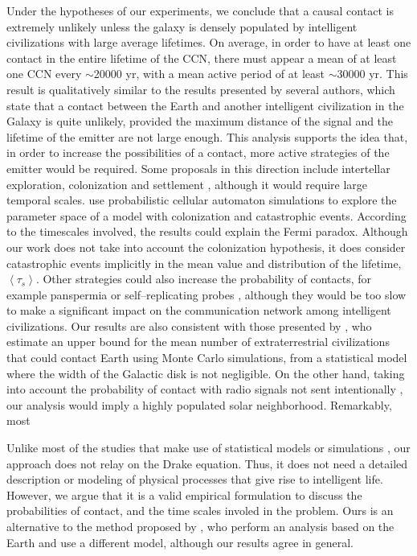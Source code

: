 \documentclass[crop]{CSLB}
\newcommand{\ceti}{CCN}
\begin{document}
Under the hypotheses of our experiments, we conclude that a causal
contact is extremely unlikely unless the galaxy is densely populated
by intelligent civilizations with large average lifetimes.
%
On average, in order to have at least one contact in the entire lifetime
of the \ceti{}, there must appear a mean of at least one \ceti{}
every $\sim$20000 yr, with a mean active period of at least
$\sim$30000 yr.
%
This result is qualitatively similar to the results presented by
several authors, which state that a contact between the Earth and
another intelligent civilization in the Galaxy is quite unlikely,
provided the maximum distance of the signal and the lifetime of the
emitter are not large enough.
%
This analysis supports the idea that, in order to increase the
possibilities of a contact, more active strategies of the emitter
would be required.
%
Some proposals in this direction include intertellar exploration,
colonization and settlement \citep{brin_great_1983, Dosovic2019,
galera_invasion_2019}, although it would require large temporal
scales.
%
\citet{Dosovic2019} use probabilistic cellular automaton simulations
to explore the parameter space of a model with colonization and
catastrophic events.
%
According to the timescales involved, the results could explain the
Fermi paradox.
%
Although our work does not take into account the colonization
hypothesis, it does consider catastrophic events implicitly in the
mean value and distribution of the lifetime, $\left<\tau_s\right>$.
%
Other strategies could also increase the probability of contacts, for
example panspermia \citep[e.g.,][]{starling_virulence_2013} or
self--replicating probes \citep[e.g.,][]{barlow_galactic_2013},
although they would be too slow to make a significant impact on the
communication network among intelligent civilizations.
%
Our results are also consistent with those presented by
\citet{grimaldi_signal_2017}, who estimate an upper bound for the mean
number of extraterrestrial civilizations that could contact Earth
using Monte Carlo simulations, from a statistical model where the width
of the Galactic disk is not negligible.
%
On the other hand, taking into account the probability of contact with
radio signals not sent intentionally \citep{horvat_calculating_2007},
our analysis would imply a highly populated solar neighborhood.
%
Remarkably, most 

%
Unlike most 
of the studies that make use of statistical models or
simulations \citep{cirkovic_temporal_2004, smith_broadcasting_2009,
bloetscher_using_2019}, our approach does not relay on the Drake
equation.
%
Thus, it does not need
a detailed description or modeling of physical processes that give rise to
intelligent life.
%
However, we argue that it is a valid empirical formulation to discuss
the probabilities of contact, and the time scales involed in the
problem.
%
Ours is an alternative to the method proposed by
\citet{balbi_impact_2018}, who perform an analysis based on the Earth
and use a different model, although our results agree in general.
\end{document}
